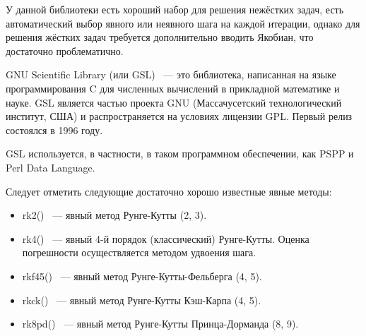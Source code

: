 У данной библиотеки есть хороший набор для решения нежёстких задач, есть автоматический выбор явного или неявного шага на каждой
итерации, однако для решения жёстких задач требуется дополнительно вводить Якобиан, что достаточно проблематично.

GNU Scientific Library (или GSL) ~--- это библиотека, написанная на языке программирования C для численных вычислений в прикладной
математике и науке. GSL является частью проекта GNU (Массачусетский технологический институт, США) и распространяется на условиях
лицензии GPL.
Первый релиз состоялся в 1996 году.

GSL используется, в частности, в таком программном обеспечении, как PSPP и Perl Data Language.

Следует отметить следующие достаточно хорошо известные явные методы:
\begin{itemize}
    \item rk2() ~--- явный метод Рунге-Кутты (2, 3).
    \item rk4() ~--- явный 4-й порядок (классический) Рунге-Кутты. Оценка погрешности осуществляется методом удвоения шага.
    \item rkf45() ~--- явный метод Рунге-Кутты-Фельберга (4, 5).
    \item rkck() ~--- явный метод Рунге-Кутты Кэш-Карпа (4, 5).
    \item rk8pd() ~--- явный метод Рунге-Кутты Принца-Дорманда (8, 9).
\end{itemize}

